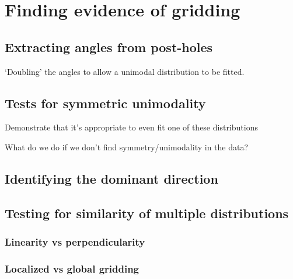 \documentclass[../../ArchStats.tex]{subfiles}
\begin{document}
\section{Finding evidence of gridding}

\subsection{Extracting angles from post-holes}
`Doubling' the angles to allow a unimodal distribution to be fitted.

\subsection{Tests for symmetric unimodality}
Demonstrate that it's appropriate to even fit one of these distributions

What do we do if we don't find symmetry/unimodality in the data?

\subsection{Identifying the dominant direction}


\subsection{Testing for similarity of multiple distributions}

\subsubsection{Linearity vs perpendicularity}

\subsubsection{Localized vs global gridding}
\end{document}
